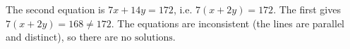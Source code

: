 The second equation is $7x+14y=172$, i.e. $7(x+2y)=172$. The first gives $7(x+2y)=168\ne172$. The equations are inconsistent (the lines are parallel and distinct), so there are $\boxed{\text{no solutions}}$.
